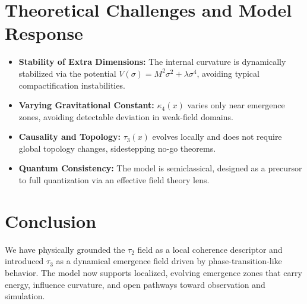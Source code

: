 \documentclass[12pt]{article}
\begin{document}
\section{Theoretical Challenges and Model Response}

\begin{itemize}
    \item \textbf{Stability of Extra Dimensions:} The internal curvature is dynamically stabilized via the potential $V(\sigma) = M^2\sigma^2 + \lambda\sigma^4$, avoiding typical compactification instabilities.
    \item \textbf{Varying Gravitational Constant:} $\kappa_4(x)$ varies only near emergence zones, avoiding detectable deviation in weak-field domains.
    \item \textbf{Causality and Topology:} $\tau_3(x)$ evolves locally and does not require global topology changes, sidestepping no-go theorems.
    \item \textbf{Quantum Consistency:} The model is semiclassical, designed as a precursor to full quantization via an effective field theory lens.
\end{itemize}

\section{Conclusion}

We have physically grounded the $\tau_2$ field as a local coherence descriptor and introduced $\tau_3$ as a dynamical emergence field driven by phase-transition-like behavior. The model now supports localized, evolving emergence zones that carry energy, influence curvature, and open pathways toward observation and simulation.
\end{document}
